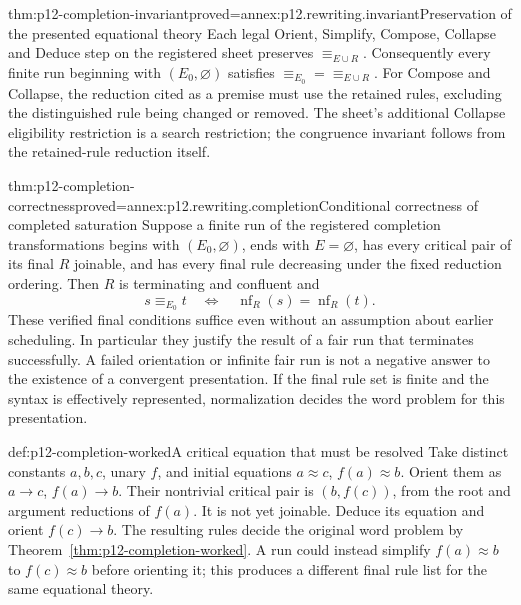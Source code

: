 \begin{hblemma}{thm:p12-completion-invariant}{proved=annex:p12.rewriting.invariant}{Preservation of the presented equational theory}
Each legal Orient, Simplify, Compose, Collapse and Deduce step on the
registered sheet preserves \(\equiv_{E\cup R}\). Consequently every
finite run beginning with \((E_0,\varnothing)\) satisfies
\(\equiv_{E_0}=\equiv_{E\cup R}\).
For Compose and Collapse, the reduction cited as a premise must use the
retained rules, excluding the distinguished rule being changed or removed.
The sheet's additional Collapse eligibility restriction is a search
restriction; the congruence invariant follows from the retained-rule
reduction itself.
\end{hblemma}

\begin{hbtheorem}{thm:p12-completion-correctness}{proved=annex:p12.rewriting.completion}{Conditional correctness of completed saturation}
Suppose a finite run of the registered completion transformations begins
with \((E_0,\varnothing)\), ends with \(E=\varnothing\), has every
critical pair of its final \(R\) joinable, and has every final rule
decreasing under the fixed reduction ordering. Then \(R\) is terminating
and confluent and
\[
 s\equiv_{E_0}t
 \quad\Longleftrightarrow\quad
 \operatorname{nf}_R(s)=\operatorname{nf}_R(t).
\]
These verified final conditions suffice even without an assumption about
earlier scheduling. In particular they justify the result of a fair run
that terminates successfully. A failed orientation or infinite fair run
is not a negative answer to the existence of a convergent presentation.
If the final rule set is finite and the syntax is effectively represented,
normalization decides the word problem for this presentation.
\end{hbtheorem}

\begin{hbexample}{def:p12-completion-worked}{A critical equation that must be resolved}
Take distinct constants \(a,b,c\), unary \(f\), and initial equations
\(a\approx c\), \(f(a)\approx b\). Orient them as
\(a\to c\), \(f(a)\to b\). Their nontrivial critical pair is
\((b,f(c))\), from the root and argument reductions of \(f(a)\).
It is not yet joinable. Deduce its equation and orient \(f(c)\to b\).
The resulting rules decide the original word problem by
Theorem~\ref{thm:p12-completion-worked}. A run could instead simplify
\(f(a)\approx b\) to \(f(c)\approx b\) before orienting it;
this produces a different final rule list for the same equational theory.
\end{hbexample}

